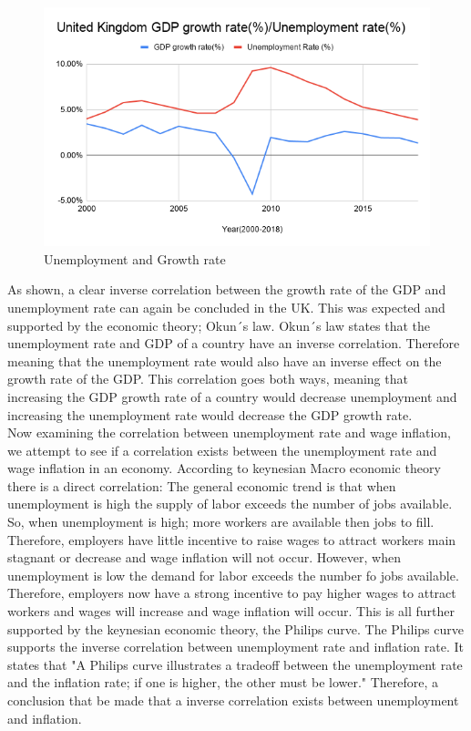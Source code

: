 \begin{figure}[H]
   \centering
   \includegraphics[scale = 0.5]{figures/United_Kingdom_GDP_Unemployment}
   \caption{Unemployment and Growth rate\cite{UK_Unemployment}\cite{UK_Growth_Rate_GDP}}
 \end{figure}

As shown, a clear inverse correlation between the growth rate of the GDP and unemployment rate can again be concluded in the UK.
This was expected and supported by the economic theory; Okun´s law.
Okun´s law states that the unemployment rate and GDP of a country have an inverse correlation.
Therefore meaning that the unemployment rate would also have an inverse effect on the growth rate of the GDP. \cite{Economics_Okuns_Law}
This correlation goes both ways, meaning that increasing the GDP growth rate of a country would decrease unemployment and increasing the unemployment rate would decrease the GDP growth rate. \\

Now examining the correlation between unemployment rate and wage inflation, we attempt to see if a correlation exists between the unemployment rate and wage inflation in an economy.
According to keynesian Macro economic theory there is a direct correlation:
The general economic trend is that when unemployment is high the supply of labor exceeds the number of jobs available.
So, when unemployment is high; more workers are available then jobs to fill.
Therefore, employers have little incentive to raise wages to attract workers main stagnant or decrease and wage inflation will not occur.
However, when unemployment is low the demand for labor exceeds the number fo jobs available. 
Therefore, employers now have a strong incentive to pay higher wages to attract workers and wages will increase and wage inflation will occur.\cite{Economics_Unemployment_Inflation}
This is all further supported by the keynesian economic theory, the Philips curve.
The Philips curve supports the inverse correlation between unemployment rate and inflation rate.
It states that "A Philips curve illustrates a tradeoff between the unemployment rate and the inflation rate; if one is higher, the other must be lower." \cite{Economics_Philips_Curve}
Therefore, a conclusion that be made that a inverse correlation exists between unemployment and inflation. \\

